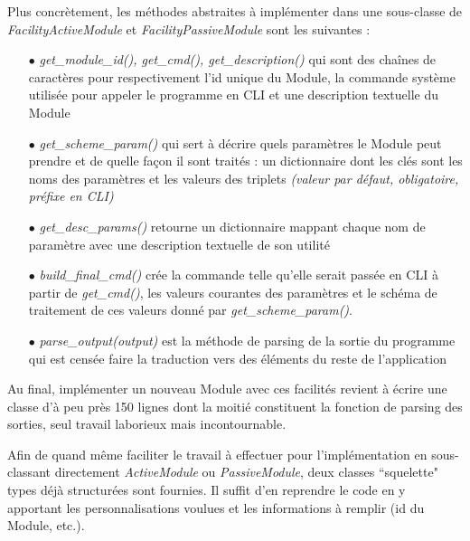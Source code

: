 \documentclass[]{article}
\begin{document}
Plus concrètement, les méthodes abstraites à implémenter dans une sous-classe de \textit{FacilityActiveModule} et \textit{FacilityPassiveModule} sont les suivantes :\\
\begin{itemize}
\item[$\bullet$] \textit{get\_module\_id(), get\_cmd(), get\_description()} qui sont des chaînes de caractères pour respectivement l'id unique du Module, la commande système utilisée pour appeler le programme en CLI et une description textuelle du Module
\vspace{0.2cm}
\item[$\bullet$] \textit{get\_scheme\_param()} qui sert à décrire quels paramètres le Module peut prendre et de quelle façon il sont traités : un dictionnaire dont les clés sont les noms des paramètres et les valeurs des triplets \textit{(valeur par défaut, obligatoire, préfixe en CLI)}
\vspace{0.2cm}
\item[$\bullet$] \textit{get\_desc\_params()} retourne un dictionnaire mappant chaque nom de paramètre avec une description textuelle de son utilité
\vspace{0.2cm}
\item[$\bullet$] \textit{build\_final\_cmd()} crée la commande telle qu'elle serait passée en CLI à partir de \textit{get\_cmd()}, les valeurs courantes des paramètres et le schéma de traitement de ces valeurs donné par \textit{get\_scheme\_param()}.
\vspace{0.2cm}
\item[$\bullet$] \textit{parse\_output(output)} est la méthode de parsing de la sortie du programme qui est censée faire la traduction vers des éléments du reste de l'application
\vspace{0.2cm}
\end{itemize}

Au final, implémenter un nouveau Module avec ces facilités revient à écrire une classe d'à peu près 150 lignes dont la moitié constituent la fonction de parsing des sorties, seul travail laborieux mais incontournable.\\

\par Afin de quand même faciliter le travail à effectuer pour l'implémentation en sous-classant directement \textit{ActiveModule} ou \textit{PassiveModule}, deux classes ``squelette" types déjà structurées sont fournies. Il suffit d'en reprendre le code en y apportant les personnalisations voulues et les informations à remplir (id du Module, etc.).\\
\end{document}

